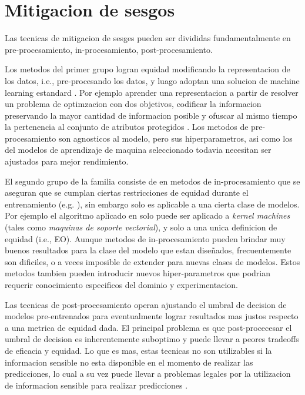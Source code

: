 \section{Mitigacion de sesgos}\label{section:mitigation}


Las tecnicas de mitigacion de sesges pueden ser divididas fundamentalmente en pre-procesamiento, in-procesamiento, post-procesamiento. 

Los metodos del primer grupo logran equidad modificando la representacion de los datos, i.e., pre-procesando los datos, y luago adoptan una solucion de machine learning estandard \cite{nips2017preproc, Kamiran2011DataPT, zemel2013learning}. Por ejemplo aprender una representacion a partir de resolver un problema de optimzacion con dos objetivos, codificar la informacion preservando la mayor cantidad de informacion posible y ofuscar al mismo tiempo la pertenencia al conjunto de atributos protegidos \cite{zemel2013learning}. Los metodos de pre-procesamiento son agnosticos al modelo, pero sus hiperparametros, asi como los del modelos de aprendizaje de maquina seleccionado todavia necesitan ser ajustados para mejor rendimiento.

El segundo grupo de la familia consiste de en metodos de in-procesamiento que se aseguran que se cumplan ciertas restricciones de equidad durante el entrenamiento (e.g. \cite{donini2018empirical, zafar2017fairness, zafar2019fairness}), sin embargo solo es aplicable a una cierta clase de modelos. Por ejemplo el algoritmo aplicado en \cite{donini2018empirical} solo puede ser aplicado a \textit{kernel machines} (tales como \textit{maquinas de soporte vectorial}), y solo a una unica definicion de equidad (i.e., EO). Aunque metodos de in-procesamiento pueden brindar muy buenos resultados para la clase del modelo que estan diseñados, frecuentemente son dificiles, o a veces imposible de extender para nuevas clases de modelos. Estos metodos tambien pueden introducir nuevos hiper-parametros que podrian requerir conocimiento especificos del dominio y experimentacion.

Las tecnicas de post-procesamiento operan ajustando el umbral de decision de modelos pre-entrenados para eventualmente lograr resultados mas justos respecto a una metrica de equidad dada. El principal problema es que post-procecesar el umbral de decision es inherentemente suboptimo y puede llevar a peores tradeoffs de eficacia y equidad. Lo que es mas, estas tecnicas no son utilizables si la informacion sensible no esta disponible en el momento de realizar las predicciones, lo cual a su vez puede llevar a problemas legales por la utilizacion de informacion sensible para realizar predicciones \cite{MacCarthy2018StandardsOF}.

